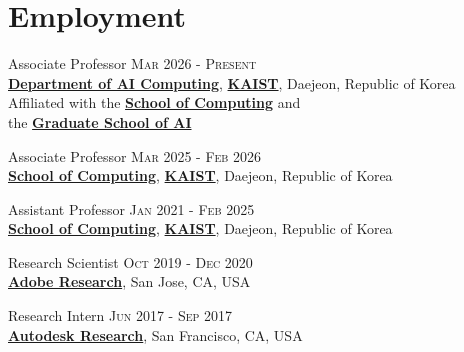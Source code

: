 \documentclass[letterpaper,10pt]{article} %
\begin{document}

\section{Employment}

Associate Professor \hfill{\textsc{Mar 2026 - Present}}\\
\href{http://aic.kaist.ac.kr/}{\textbf{Department of AI Computing}}, \href{http://www.kaist.ac.kr/}{\textbf{KAIST}}, Daejeon, Republic of Korea\\
Affiliated with
the \href{https://cs.kaist.ac.kr/}{\textbf{School of Computing}} and \\
the \href{https://gsai.kaist.ac.kr/}{\textbf{Graduate School of AI}}


Associate Professor \hfill{\textsc{Mar 2025 - Feb 2026}}\\
\href{http://cs.kaist.ac.kr/}{\textbf{School of Computing}}, \href{http://www.kaist.ac.kr/}{\textbf{KAIST}}, Daejeon, Republic of Korea


Assistant Professor \hfill{\textsc{Jan 2021 - Feb 2025}}\\
\href{http://cs.kaist.ac.kr/}{\textbf{School of Computing}}, \href{http://www.kaist.ac.kr/}{\textbf{KAIST}}, Daejeon, Republic of Korea


Research Scientist \hfill{\textsc{Oct 2019 - Dec 2020}}\\
\href{https://research.adobe.com}{\textbf{Adobe Research}}, San Jose, CA, USA 


Research Intern \hfill{\textsc{Jun 2017 - Sep 2017}}\\
\href{https://www.autodeskresearch.com}{\textbf{Autodesk Research}}, San Francisco, CA, USA

\end{document}

